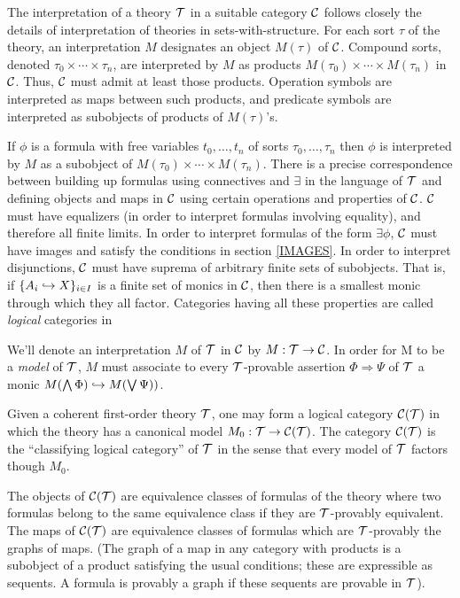 The interpretation of a theory $\cal T$ in a suitable category ${\bf \cal C}$ follows closely the details of interpretation of theories in 
sets-with-structure. For each sort $\tau$ of the theory, an 
interpretation $M$ designates an object $M(\tau)$ of ${\bf \cal C}$. 
Compound sorts, denoted $\tau_0 \times \cdots \times \tau_n$, are 
interpreted by $M$ as products $M(\tau_0) \times \cdots \times 
M(\tau_n)$ in ${\bf \cal C}$. Thus, ${\bf \cal C}$ must admit at least those 
products. Operation symbols are interpreted as maps between such 
products, and predicate symbols are interpreted as subobjects of 
products of $M(\tau)$'s.

If $\phi$ is a formula with free variables $t_0,\ldots,t_n$ of sorts 
$\tau_0,\ldots,\tau_n$ then $\phi$ is interpreted by $M$ as a 
subobject of $M(\tau_0) \times \cdots \times M(\tau_n)$. There is a 
precise correspondence between building up formulas using connectives 
and $\exists$ in the language of $\cal T$ and defining objects and 
maps in ${\bf \cal C}$ using certain operations and properties of ${\bf \cal C}$. 
${\bf \cal C}$ must have equalizers (in order to interpret formulas 
involving equality), and therefore all finite limits. In order to 
interpret formulas of the form $\exists \phi$, ${\bf \cal C}$ must have 
images and satisfy the conditions in section \ref{IMAGES}. In order 
to interpret disjunctions, ${\bf \cal C}$ must have suprema of arbitrary 
finite sets of subobjects. That is, if $\{A_i \hookrightarrow X\}_{i \in I}$ is 
a finite set of monics in ${\bf \cal C}$, then there is a smallest monic 
through which they all factor. Categories having all these properties 
are called {\em logical} categories in \cite{MR} 

We'll denote an interpretation $M$ of $\cal T$ in ${\bf \cal C}$ by $M : 
\cal T \to {\bf \cal C}$. In order for M to be a {\em model} of $\cal T$, 
$M$ must associate to every $\cal T$-provable assertion $\Phi 
\Rightarrow \Psi$ of $\cal T$ a monic $M(\bigwedge \Phi) \hookrightarrow 
M(\bigvee \Psi))$. 

Given a coherent first-order theory $\cal T$, one may form a logical 
category ${\bf \cal C} (\cal T)$ in which the theory has a canonical model 
$M_0 : \cal T \to {\bf \cal C} (\cal T)$. The category ${\bf \cal C} (\cal T)$ is 
the ``classifying logical category'' of $\cal T$ in the sense that 
every model of $\cal T$ factors though $M_0$. 

The objects of ${\bf \cal C} (\cal T)$ are equivalence classes of formulas 
of the theory where two formulas belong to the same equivalence class 
if they are $\cal T$-provably equivalent. The maps of ${\bf \cal C} (\cal 
T)$ are equivalence classes of formulas which are $\cal T$-provably 
the graphs of maps. (The graph of a map in any category with products 
is a subobject of a product satisfying the usual conditions; these 
are expressible as sequents. A formula is provably a graph if these 
sequents are provable in $\cal T$).

